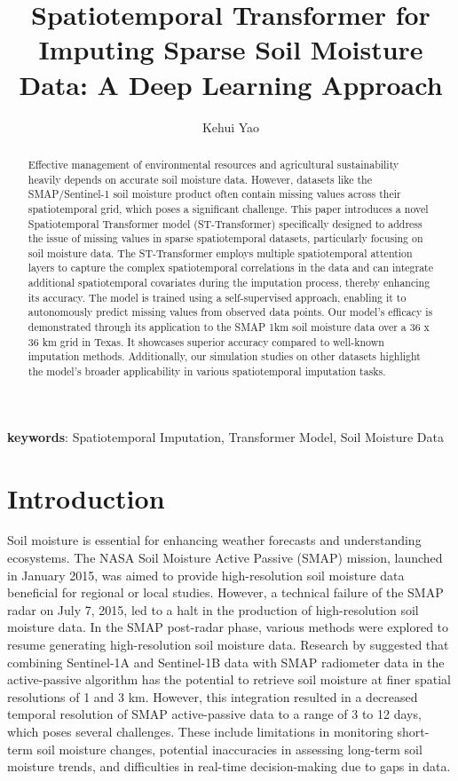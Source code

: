\documentclass[11pt]{article}
\title{Spatiotemporal Transformer for Imputing Sparse Soil Moisture Data: A Deep Learning Approach}
\author[1]{Kehui Yao}
\affil[1]{Department of Statistics, University of Wisconsin-Madison}
\date{}
\begin{document}
\maketitle

\begin{abstract}
	Effective management of environmental resources and agricultural sustainability heavily depends on accurate soil moisture data. However, datasets like the SMAP/Sentinel-1 soil moisture product often contain missing values across their spatiotemporal grid, which poses a significant challenge. This paper introduces a novel Spatiotemporal Transformer model (ST-Transformer) specifically designed to address the issue of missing values in sparse spatiotemporal datasets, particularly focusing on soil moisture data. The ST-Transformer employs multiple spatiotemporal attention layers to capture the complex spatiotemporal correlations in the data and can integrate additional spatiotemporal covariates during the imputation process, thereby enhancing its accuracy. The model is trained using a self-supervised approach, enabling it to autonomously predict missing values from observed data points. Our model's efficacy is demonstrated through its application to the SMAP 1km soil moisture data over a 36 x 36 km grid in Texas. It showcases superior accuracy compared to well-known imputation methods. Additionally, our simulation studies on other datasets highlight the model's broader applicability in various spatiotemporal imputation tasks.
\end{abstract}

\textbf{keywords}: Spatiotemporal Imputation, 
Transformer Model, Soil Moisture Data

\section{Introduction}
Soil moisture is essential for enhancing weather forecasts and understanding ecosystems. The NASA Soil Moisture Active Passive (SMAP) mission, launched in January 2015, was aimed to provide high-resolution soil moisture data beneficial for regional or local studies. However, a technical failure of the SMAP radar on July 7, 2015, led to a halt in the production of high-resolution soil moisture data. In the SMAP post-radar phase, various methods were explored to resume generating high-resolution soil moisture data. Research by \citet{das2019smap} suggested that combining Sentinel-1A and Sentinel-1B data with SMAP radiometer data in the active-passive algorithm has the potential to retrieve soil moisture at finer spatial resolutions of 1 and 3 km. However, this integration resulted in a decreased temporal resolution of SMAP active-passive data to a range of 3 to 12 days, which poses several challenges. These include limitations in monitoring short-term soil moisture changes, potential inaccuracies in assessing long-term soil moisture trends, and difficulties in real-time decision-making due to gaps in data.
\end{document}
